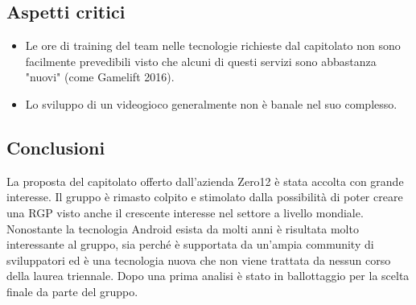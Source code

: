 \subsection{Aspetti critici}
\begin{itemize}
\item Le ore di training del team nelle tecnologie richieste dal capitolato non sono facilmente prevedibili visto che alcuni di questi servizi sono abbastanza "nuovi" (come Gamelift 2016).
\item Lo sviluppo di un videogioco generalmente non è banale nel suo complesso.
\end{itemize}
\subsection{Conclusioni}
La proposta del capitolato offerto dall'azienda Zero12 è stata accolta con grande interesse. Il gruppo è rimasto colpito e stimolato dalla possibilità 
di poter creare una RGP visto anche il crescente interesse nel settore a livello mondiale. Nonostante la tecnologia Android esista da molti anni è risultata molto
interessante al gruppo, sia perché è supportata da un'ampia community di sviluppatori ed è una tecnologia nuova che non viene trattata da nessun corso della laurea triennale. Dopo una prima analisi è stato in ballottaggio per la scelta finale da parte del gruppo.

